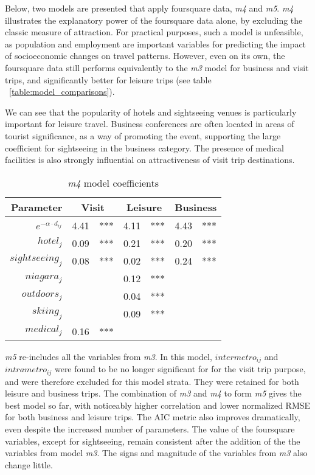 Below, two models are presented that apply foursquare data, \textit{m4} and \textit{m5}. \textit{m4} illustrates the explanatory power of the foursquare data alone, by excluding the classic measure of attraction. For practical purposes, such a model is unfeasible, as population and employment are important variables for predicting the impact of socioeconomic changes on travel patterns. However, even on its own, the foursquare data still performs equivalently to the \textit{m3} model for business and visit trips, and significantly better for leisure trips (see table ~\ref{table:model_comparisons}).

We can see that the popularity of hotels and sightseeing venues is particularly important for leisure travel. Business conferences are often located in areas of tourist significance, as a way of promoting the event, supporting the large coefficient for sightseeing in the business category. The presence of medical facilities is also strongly influential on attractiveness of visit trip destinations. 


\begin{table}[H]
\centering
\caption{\textit{m4} model coefficients}
\label{table:m4-coeff}
\begin{tabular}{@{}rrlrlrl@{}}
  \toprule
 Parameter & \multicolumn{2}{c}{Visit} & \multicolumn{2}{c}{Leisure} & \multicolumn{2}{c}{Business} \\ \midrule
  $e^{-\alpha  \cdot d_{ij}}$  & 4.41 & *** & 4.11 & *** & 4.43 & *** \\ 
  $hotel_j$ & 0.09 & *** & 0.21 & *** & 0.20 & *** \\ 
  $sightseeing_j$ & 0.08 & *** & 0.02 & *** & 0.24 & *** \\ 
  $niagara_j$  &  &  & 0.12 & *** &  &  \\ 
  $outdoors_j$  &  &  & 0.04 & *** &  &  \\ 
  $skiing_j$   &  &  & 0.09 & *** &  &  \\ 
  $medical_j$  & 0.16 & *** &  &  &  &  \\ 
   \bottomrule
\end{tabular}
\end{table}

\textit{m5} re-includes all the variables from \textit{m3}. In this model, $intermetro_{ij}$ and $intrametro_{ij}$ were found to be no longer significant for for the visit trip purpose, and were therefore excluded for this model strata. They were retained for both leisure and business trips. The combination of \textit{m3} and \textit{m4} to form \textit{m5} gives the best model so far, with noticeably higher correlation and lower normalized RMSE for both business and leisure trips. The AIC metric also improves dramatically, even despite the increased number of parameters. The value of the foursquare variables, except for sightseeing, remain consistent after the addition of the the variables from model \textit{m3}. The signs and magnitude of the variables from \textit{m3} also change little.

